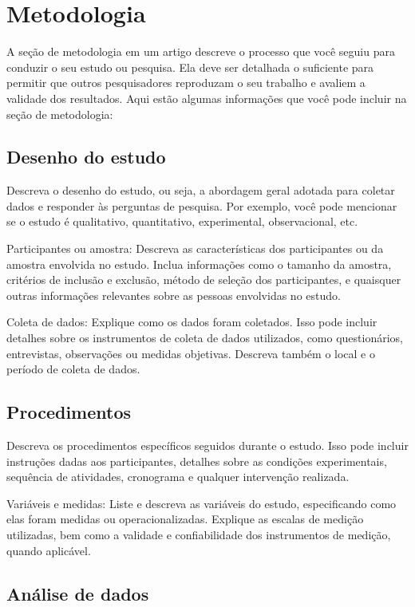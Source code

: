 \section{Metodologia}\label{:methodoloy}

A seção de metodologia em um artigo descreve o processo que você seguiu para conduzir o seu estudo ou pesquisa. Ela deve ser detalhada o suficiente para permitir que outros pesquisadores reproduzam o seu trabalho e avaliem a validade dos resultados. Aqui estão algumas informações que você pode incluir na seção de metodologia:

\subsection{Desenho do estudo}
Descreva o desenho do estudo, ou seja, a abordagem geral adotada para coletar dados e responder às perguntas de pesquisa. Por exemplo, você pode mencionar se o estudo é qualitativo, quantitativo, experimental, observacional, etc.

Participantes ou amostra: Descreva as características dos participantes ou da amostra envolvida no estudo. Inclua informações como o tamanho da amostra, critérios de inclusão e exclusão, método de seleção dos participantes, e quaisquer outras informações relevantes sobre as pessoas envolvidas no estudo.

Coleta de dados: Explique como os dados foram coletados. Isso pode incluir detalhes sobre os instrumentos de coleta de dados utilizados, como questionários, entrevistas, observações ou medidas objetivas. Descreva também o local e o período de coleta de dados.

\subsection{Procedimentos}
Descreva os procedimentos específicos seguidos durante o estudo. Isso pode incluir instruções dadas aos participantes, detalhes sobre as condições experimentais, sequência de atividades, cronograma e qualquer intervenção realizada.

Variáveis e medidas: Liste e descreva as variáveis do estudo, especificando como elas foram medidas ou operacionalizadas. Explique as escalas de medição utilizadas, bem como a validade e confiabilidade dos instrumentos de medição, quando aplicável.

\subsection{Análise de dados}

